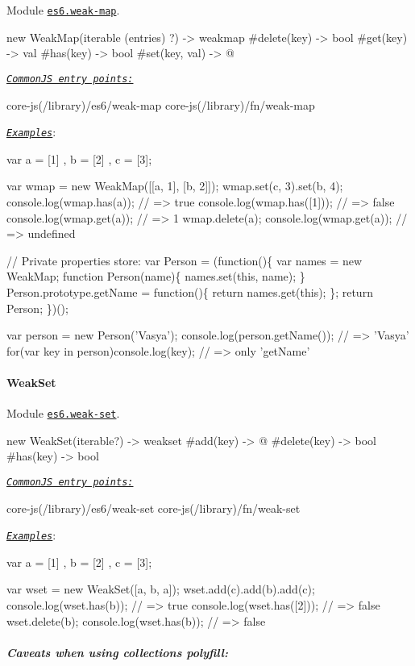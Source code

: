 Module \href{https://github.com/zloirock/core-js/blob/v2.6.0/modules/es6.weak-map.js}{\tt {\ttfamily es6.\+weak-\/map}}. 
\begin{DoxyCode}
new WeakMap(iterable (entries) ?) -> weakmap
  #delete(key)                    -> bool
  #get(key)                       -> val
  #has(key)                       -> bool
  #set(key, val)                  -> @
\end{DoxyCode}
 \href{#commonjs}{\tt {\itshape Common\+JS entry points\+:}} 
\begin{DoxyCode}
core-js(/library)/es6/weak-map
core-js(/library)/fn/weak-map
\end{DoxyCode}
 \href{http://goo.gl/SILXyw}{\tt {\itshape Examples}}\+: 
\begin{DoxyCode}
var a = [1]
  , b = [2]
  , c = [3];

var wmap = new WeakMap([[a, 1], [b, 2]]);
wmap.set(c, 3).set(b, 4);
console.log(wmap.has(a));   // => true
console.log(wmap.has([1])); // => false
console.log(wmap.get(a));   // => 1
wmap.delete(a);
console.log(wmap.get(a));   // => undefined

// Private properties store:
var Person = (function()\{
  var names = new WeakMap;
  function Person(name)\{
    names.set(this, name);
  \}
  Person.prototype.getName = function()\{
    return names.get(this);
  \};
  return Person;
\})();

var person = new Person('Vasya');
console.log(person.getName());          // => 'Vasya'
for(var key in person)console.log(key); // => only 'getName'
\end{DoxyCode}
 \paragraph*{Weak\+Set}

Module \href{https://github.com/zloirock/core-js/blob/v2.6.0/modules/es6.weak-set.js}{\tt {\ttfamily es6.\+weak-\/set}}. 
\begin{DoxyCode}
new WeakSet(iterable?) -> weakset
  #add(key)            -> @
  #delete(key)         -> bool
  #has(key)            -> bool
\end{DoxyCode}
 \href{#commonjs}{\tt {\itshape Common\+JS entry points\+:}} 
\begin{DoxyCode}
core-js(/library)/es6/weak-set
core-js(/library)/fn/weak-set
\end{DoxyCode}
 \href{http://goo.gl/TdFbEx}{\tt {\itshape Examples}}\+: 
\begin{DoxyCode}
var a = [1]
  , b = [2]
  , c = [3];

var wset = new WeakSet([a, b, a]);
wset.add(c).add(b).add(c);
console.log(wset.has(b));   // => true
console.log(wset.has([2])); // => false
wset.delete(b);
console.log(wset.has(b));   // => false
\end{DoxyCode}
 \subparagraph*{Caveats when using collections polyfill\+:}


